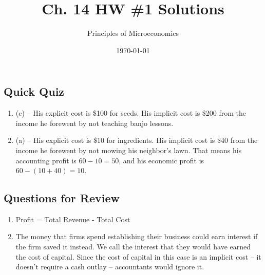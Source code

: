 \documentclass{article}
\title{Ch. 14 HW \#1 Solutions}
\author{Principles of Microeconomics}
\date{\today}
\begin{document}
\maketitle

\subsection*{Quick Quiz}

\begin{enumerate}

\item (c) -- His explicit cost is \$100 for seeds. His implicit cost is \$200 from the income he forewent by not teaching banjo lessons.

\item (a) -- His explicit cost is \$10 for ingredients. His implicit cost is \$40 from the income he forewent by not mowing his neighbor's lawn. That means his accounting profit is $60 - 10 = 50$, and his economic profit is $60 - (10 + 40) = 10$. 

\end{enumerate}

\subsection*{Questions for Review}

\begin{enumerate}

\item Profit = Total Revenue - Total Cost

\item The money that firms spend establishing their business could earn interest if the firm saved it instead. We call the interest that they would have earned the cost of capital. Since the cost of capital in this case is an implicit cost -- it doesn't require a cash outlay -- accountants would ignore it.
\end{enumerate}
\end{document}
